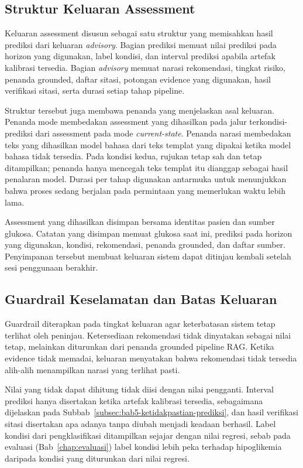 \subsection{Struktur Keluaran Assessment}
\label{subsec:bab5-struktur-assessment-output}

Keluaran assessment disusun sebagai satu struktur yang memisahkan hasil prediksi dari keluaran \textit{advisory}. Bagian prediksi memuat nilai prediksi pada
horizon yang digunakan, label kondisi, dan interval prediksi apabila artefak kalibrasi tersedia. Bagian \textit{advisory} memuat narasi rekomendasi, tingkat
risiko, penanda grounded, daftar sitasi, potongan evidence yang digunakan, hasil verifikasi sitasi, serta durasi setiap tahap pipeline.

Struktur tersebut juga membawa penanda yang menjelaskan asal keluaran. Penanda mode membedakan assessment yang dihasilkan pada jalur terkondisi-prediksi dari
assessment pada mode \textit{current-state}. Penanda narasi membedakan teks yang dihasilkan model bahasa dari teks templat yang dipakai ketika model bahasa tidak tersedia. Pada kondisi kedua, rujukan
tetap sah dan tetap ditampilkan; penanda hanya mencegah teks templat itu dianggap sebagai hasil penalaran model. Durasi per tahap digunakan antarmuka untuk menunjukkan bahwa proses sedang berjalan pada permintaan yang memerlukan waktu lebih lama.

Assessment yang dihasilkan disimpan bersama identitas pasien dan sumber glukosa. Catatan yang disimpan memuat glukosa saat ini, prediksi pada horizon yang
digunakan, kondisi, rekomendasi, penanda grounded, dan daftar sumber. Penyimpanan tersebut membuat keluaran sistem dapat ditinjau kembali setelah sesi
penggunaan berakhir.

\subsection{Guardrail Keselamatan dan Batas Keluaran}
\label{subsec:bab5-guardrail-keselamatan}

Guardrail diterapkan pada tingkat keluaran agar keterbatasan sistem tetap terlihat oleh peninjau. Ketersediaan rekomendasi tidak dinyatakan sebagai nilai tetap,
melainkan diturunkan dari penanda grounded pipeline RAG. Ketika evidence tidak memadai, keluaran menyatakan bahwa rekomendasi tidak tersedia alih-alih
menampilkan narasi yang terlihat pasti.

Nilai yang tidak dapat dihitung tidak diisi dengan nilai pengganti. Interval prediksi hanya disertakan ketika artefak kalibrasi tersedia, sebagaimana dijelaskan
pada Subbab~\ref{subsec:bab5-ketidakpastian-prediksi}, dan hasil verifikasi sitasi disertakan apa adanya tanpa diubah menjadi keadaan berhasil. Label kondisi dari
pengklasifikasi ditampilkan sejajar dengan nilai regresi, sebab pada evaluasi (Bab~\ref{chap:evaluasi}) label kondisi lebih peka terhadap hipoglikemia daripada
kondisi yang diturunkan dari nilai regresi.

